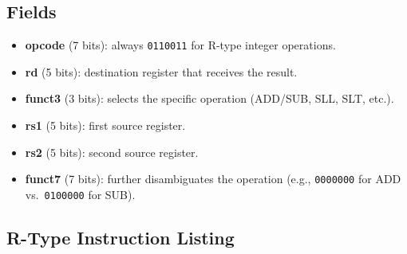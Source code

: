 \documentclass[12pt, a4paper, oneside]{book}
\begin{document}
\subsection{Fields}

\begin{itemize}
  \item \textbf{\color{purple}opcode} (7 bits): always \texttt{0110011} for R-type integer operations.
  \item \textbf{\color{purple}rd} (5 bits): destination register that receives the result.
  \item \textbf{\color{purple}funct3} (3 bits): selects the specific operation (ADD/SUB, SLL, SLT, etc.).
  \item \textbf{\color{purple}rs1} (5 bits): first source register.
  \item \textbf{\color{purple}rs2} (5 bits): second source register.
  \item \textbf{\color{purple}funct7} (7 bits): further disambiguates the operation (e.g., \texttt{0000000} for ADD vs.\ \texttt{0100000} for SUB).
\end{itemize}

\subsection{R-Type Instruction Listing}
\end{document}
